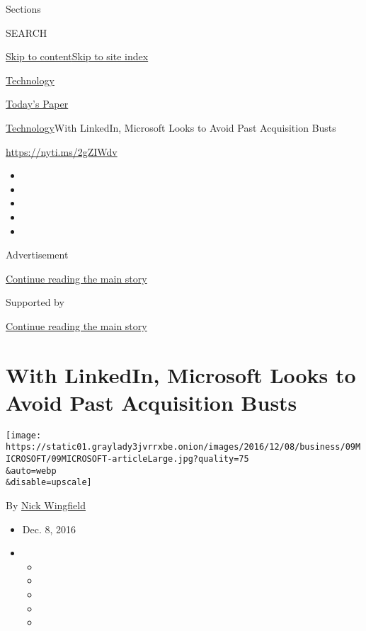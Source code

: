 Sections

SEARCH

\protect\hyperlink{site-content}{Skip to
content}\protect\hyperlink{site-index}{Skip to site index}

\href{https://www.nytimes3xbfgragh.onion/section/technology}{Technology}

\href{https://myaccount.nytimes3xbfgragh.onion/auth/login?response_type=cookie\&client_id=vi}{}

\href{https://www.nytimes3xbfgragh.onion/section/todayspaper}{Today's
Paper}

\href{/section/technology}{Technology}\textbar{}With LinkedIn, Microsoft
Looks to Avoid Past Acquisition Busts

\url{https://nyti.ms/2gZIWdv}

\begin{itemize}
\item
\item
\item
\item
\item
\end{itemize}

Advertisement

\protect\hyperlink{after-top}{Continue reading the main story}

Supported by

\protect\hyperlink{after-sponsor}{Continue reading the main story}

\hypertarget{with-linkedin-microsoft-looks-to-avoid-past-acquisition-busts}{%
\section{With LinkedIn, Microsoft Looks to Avoid Past Acquisition
Busts}\label{with-linkedin-microsoft-looks-to-avoid-past-acquisition-busts}}

\texttt{[image: https://static01.graylady3jvrrxbe.onion/images/2016/12/08/business/09MICROSOFT/09MICROSOFT-articleLarge.jpg?quality=75\\\&auto=webp\\\&disable=upscale]}

By \href{http://www.nytimes3xbfgragh.onion/by/nick-wingfield}{Nick
Wingfield}

\begin{itemize}
\item
  Dec. 8, 2016
\item
  \begin{itemize}
  \item
  \item
  \item
  \item
  \item
  \end{itemize}
\end{itemize}

